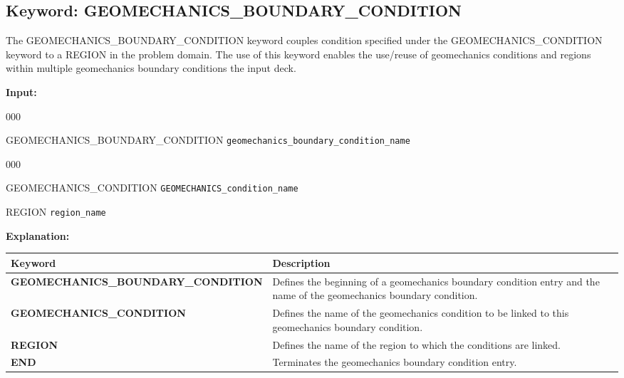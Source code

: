 
\newpage
\protect\hypertarget{target_geomech_bc}{}
 
\subsection{Keyword: GEOMECHANICS\_BOUNDARY\_CONDITION}

The GEOMECHANICS\_BOUNDARY\_CONDITION keyword couples condition specified under the GEOMECHANICS\_CONDITION keyword to a REGION in the problem domain.  The use of this keyword enables the use/reuse of geomechanics conditions and regions within multiple geomechanics boundary conditions the input deck.

{\noindent\bf Input:}

\begin{deflist}{000}
\item[GEOMECHANICS\_BOUNDARY\_CONDITION] {\tt geomechanics\_boundary\_condition\_name}
\begin{deflist}{000}
\item[GEOMECHANICS\_CONDITION] {\tt GEOMECHANICS\_condition\_name}
\item[REGION] {\tt region\_name}
\end{deflist}
\item[\keyend]
\end{deflist}

{\noindent\bf Explanation:}

\begin{center}
\begin{tabularx}{\linewidth}{lX}
\toprule[1.5pt]
\bf Keyword & \bf Description\\
\midrule
\bf GEOMECHANICS\_BOUNDARY\_CONDITION & Defines the beginning of a geomechanics boundary condition entry and the name of the geomechanics boundary condition.\\
\midrule
\bf GEOMECHANICS\_CONDITION & Defines the name of the geomechanics condition to be linked to this geomechanics boundary condition.\\
\midrule
\bf REGION & Defines the name of the region to which the conditions are linked.\\
\midrule
\bf END & Terminates the geomechanics boundary condition entry.\\
\bottomrule[1.5pt]
\end{tabularx}
\end{center}


